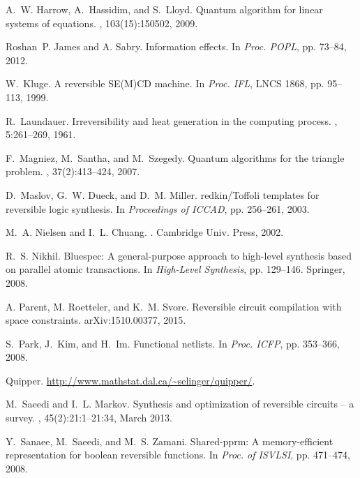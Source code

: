 \documentclass{article}
\theoremstyle{plain}
\theoremstyle{definition}
\begin{document}
\begin{thebibliography}{10}
A.~W. Harrow, A.~Hassidim, and S.~Lloyd.
\newblock Quantum algorithm for linear systems of equations.
, 103(15):150502, 2009.

Roshan~P. James and A. Sabry.
\newblock Information effects.
\newblock In {\em Proc. POPL}, pp. 73--84, 2012.

W.~Kluge.
\newblock A reversible {SE(M)CD} machine.
\newblock In {\em Proc. IFL}, LNCS 1868, pp.
  95--113, 1999.

R.~Laundauer.
\newblock Irreversibility and heat generation in the computing process.
, 5:261--269, 1961.

F.~Magniez, M.~Santha, and M.~Szegedy.
\newblock Quantum algorithms for the triangle problem.
, 37(2):413--424, 2007.

D.~Maslov, G.~W. Dueck, and D.~M. Miller.
redkin/{T}offoli templates for reversible logic synthesis.
\newblock In {\em Proceedings of ICCAD}, pp. 256--261, 2003.

M.~A. Nielsen and I.~L. Chuang.
.
\newblock Cambridge Univ. Press, 2002.

R.~S. Nikhil.
\newblock Bluespec: A general-purpose approach to high-level synthesis based on
  parallel atomic transactions.
\newblock In {\em High-Level Synthesis}, pp. 129--146. Springer, 2008.

A. Parent, M. Roetteler, and K.~M. Svore.
\newblock Reversible circuit compilation with space constraints.
\newblock arXiv:1510.00377, 2015.

S.~Park, J.~Kim, and H.~Im.
\newblock Functional netlists.
\newblock In {\em Proc. ICFP}, pp. 353--366, 2008.

Quipper.
\newblock \url{http://www.mathstat.dal.ca/~selinger/quipper/}.

M.~Saeedi and I.~L. Markov.
\newblock Synthesis and optimization of reversible circuits -- a survey.
, 45(2):21:1--21:34, March 2013.

Y.~Sanaee, M.~Saeedi, and M.~S. Zamani.
\newblock Shared-pprm: A memory-efficient representation for boolean reversible
  functions.
\newblock In {\em Proc. of ISVLSI}, pp. 471--474, 2008.


\end{thebibliography}
\end{document}
